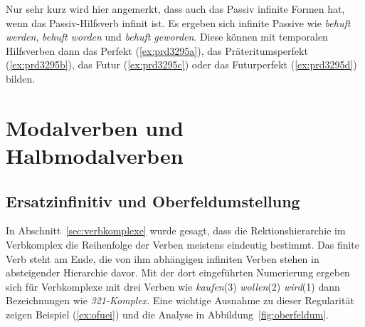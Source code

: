Nur sehr kurz wird hier angemerkt, dass auch das Passiv infinite Formen hat, wenn das Passiv-Hilfsverb infinit ist.
Es ergeben sich infinite Passive wie \textit{behuft werden}, \textit{behuft worden} und \textit{behuft geworden}.
Diese können mit temporalen Hilfsverben dann das Perfekt (\ref{ex:prd3295a}), das Präteritumsperfekt (\ref{ex:prd3295b}), das Futur (\ref{ex:prd3295c}) oder das Futurperfekt (\ref{ex:prd3295d}) bilden.

\begin{exe}
  \ex\label{ex:prd3295} 
  \begin{xlist}
  \end{xlist}
\end{exe}




\section{Modalverben und Halbmodalverben}

\label{sec:modalverbkonstruktionen}

\subsection{Ersatzinfinitiv und Oberfeldumstellung}

\label{sec:ersiofu}


In Abschnitt~\ref{sec:verbkomplexe} wurde gesagt, dass die Rektionshierarchie im Verbkomplex die Reihenfolge der Verben meistens eindeutig bestimmt.
Das finite Verb steht am Ende, die von ihm abhängigen infiniten Verben stehen in absteigender Hierarchie davor.
Mit der dort eingeführten Numerierung ergeben sich für Verbkomplexe mit drei Verben wie \textit{kaufen}(3) \textit{wollen}(2) \textit{wird}(1) dann Bezeichnungen wie \textit{321-Komplex}.
Eine wichtige Ausnahme zu dieser Regularität zeigen Beispiel (\ref{ex:ofuei}) und die Analyse in Abbildung~\ref{fig:oberfeldum}.

\begin{exe}
\end{exe}

